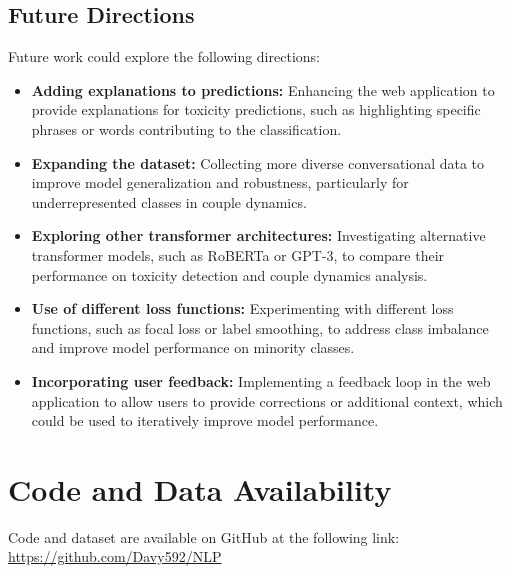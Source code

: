 \documentclass[conference]{IEEEtran}
\begin{document}
\subsection{Future Directions}

Future work could explore the following directions:

\begin{itemize}
    \item \textbf{Adding explanations to predictions:} Enhancing the web application to provide explanations for toxicity predictions, such as highlighting specific phrases or words contributing to the classification.
    \item \textbf{Expanding the dataset:} Collecting more diverse conversational data to improve model generalization and robustness, particularly for underrepresented classes in couple dynamics.
    \item \textbf{Exploring other transformer architectures:} Investigating alternative transformer models, such as RoBERTa or GPT-3, to compare their performance on toxicity detection and couple dynamics analysis.
    \item \textbf{Use of different loss functions:} Experimenting with different loss functions, such as focal loss or label smoothing, to address class imbalance and improve model performance on minority classes.
    \item \textbf{Incorporating user feedback:} Implementing a feedback loop in the web application to allow users to provide corrections or additional context, which could be used to iteratively improve model performance.
\end{itemize}
\noindent

\section{Code and Data Availability}

Code and dataset are available on GitHub at the following link: \url{https://github.com/Davy592/NLP}



\end{document}
